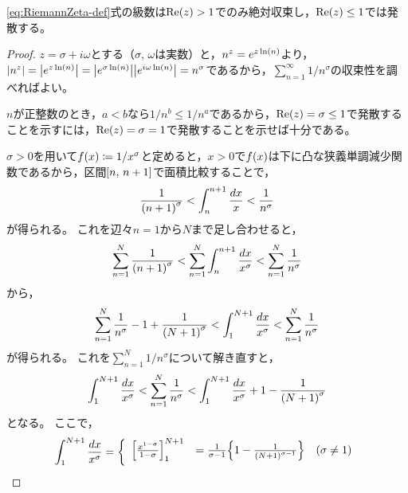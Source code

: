 \documentclass[a4paper,draft]{ltjsarticle}
\begin{document}
\begin{prop}[絶対収束域]\label{prop:RiemannZeta-絶対収束}
    \eqref{eq:RiemannZeta-def}式の級数は$\re{z}>1$でのみ絶対収束し，$\re{z}\leq 1$では発散する。
    \begin{proof}
        $z=\sigma+i\omega$とする（$\sigma$, $\omega$は実数）と，$n^z=e^{z\fun{\ln}{n}}$より，$\abs{n^z}=\abs{e^{z\fun{\ln}{n}}}=\abs{e^{\sigma\fun{\ln}{n}}}\abs{e^{i\omega\fun{\ln}{n}}}=n^\sigma$であるから，$\sum_{n=1}^\infty 1/n^\sigma$の収束性を調べればよい。

        $n$が正整数のとき，$a<b$なら$1/n^b\leq1/n^a$であるから，$\re{z}=\sigma\leq 1$で発散することを示すには，$\re{z}=\sigma=1$で発散することを示せば十分である。

        $\sigma>0$を用いて$\fun{f}{x}\coloneqq 1/x^\sigma$と定めると，$x>0$で$\fun{f}{x}$は下に凸な狭義単調減少関数であるから，区間$\cinterval{n}{n+1}$で面積比較することで，
        \begin{equation}
            \frac{1}{\pare{n+1}^\sigma} < \int_{n}^{n+1}\frac{dx}x < \frac{1}{n^\sigma}
        \end{equation}
        が得られる。
        これを辺々$n=1$から$N$まで足し合わせると，
        \begin{equation}
            \sum_{n=1}^N\frac{1}{\pare{n+1}^\sigma}
            <\sum_{n=1}^N \int_{n}^{n+1}\frac{dx}{x^\sigma} < \sum_{n=1}^N\frac{1}{n^\sigma}
        \end{equation}
        から，
        \begin{equation}
            \sum_{n=1}^N \frac{1}{n^\sigma} - 1 + \frac{1}{\pare{N+1}^\sigma} < \int_1^{N+1}\frac{dx}{x^{\sigma}} < \sum_{n=1}^N\frac{1}{n^{\sigma}}
        \end{equation}
        が得られる。
        これを$\sum_{n=1}^N 1/n^\sigma$について解き直すと，
        \begin{equation}
            \int_1^{N+1}\frac{dx}{x^\sigma} <\sum_{n=1}^N\frac{1}{n^\sigma}<\int_{1}^{N+1}\frac{dx}{x^{\sigma}}+1-\frac{1}{\pare{N+1}^\sigma}
        \end{equation}
        となる。
        ここで，
        \begin{equation}
            \int_1^{N+1}\frac{dx}{x^\sigma}=\case{
                \begin{aligned}
                    \begin{array}{rll}
                        \squ{\frac{x^{1-\sigma}}{1-\sigma}}_1^{N+1}&=\frac{1}{\sigma-1}\bra{1-\frac{1}{\pare{N+1}^{\sigma-1}}} &\pare{\sigma \ne 1}
                        \vspace{5pt}\\

\end{array}
\end{aligned}}
\end{equation}
\end{proof}
\end{prop}
\end{document}
